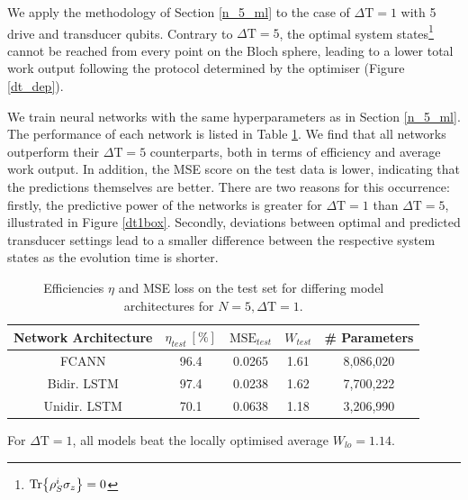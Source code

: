 We apply the methodology of Section \ref{n_5_ml} to the case of $\Delta \mathrm{T} = 1$ with 5 drive and transducer qubits.
Contrary to $\Delta \mathrm{T} = 5$, the optimal system states\footnote{$\Tr{\rho_S^i \sigma_z} = 0$} cannot be reached from every point on the Bloch sphere, leading to a lower total work output following the protocol determined by the optimiser (Figure \ref{dt_dep}).

We train neural networks with the same hyperparameters as in Section \ref{n_5_ml}.
The performance of each network is listed in Table \ref{effdt1}.
We find that all networks outperform their $\Delta \mathrm{T} = 5$ counterparts, both in terms of efficiency and average work output.
In addition, the MSE score on the test data is lower, indicating that the predictions themselves are better.
There are two reasons for this occurrence: firstly, the predictive power of the networks is greater for $\Delta \mathrm{T} = 1$ than $\Delta \mathrm{T} = 5$, illustrated in Figure \ref{dt1box}.
Secondly, deviations between optimal and predicted transducer settings lead to a smaller difference between the respective system states as the evolution time is shorter.

\begin{table}[h]
	\centering
	\begin{tabular}{ c | c | c | c | c }
		Network Architecture & $\eta_{test} \ [\%]$ & $\mathrm{MSE}_{test}$  & $W_{test}$ & \# Parameters \\
		\hline
		FCANN        & 96.4 & 0.0265 & 1.61 & 8,086,020 \\
		Bidir. LSTM  & 97.4 & 0.0238 & 1.62 & 7,700,222 \\
		Unidir. LSTM & 70.1 & 0.0638 & 1.18 & 3,206,990 \\
	\end{tabular}
	\caption{Efficiencies $\eta$ and MSE loss on the test set for differing model architectures for $N=5, \Delta \mathrm{T} = 1$.}
	\label{effdt1}
\end{table}

For $\Delta \mathrm{T} = 1$, all models beat the locally optimised average $W_{lo} = 1.14$.


